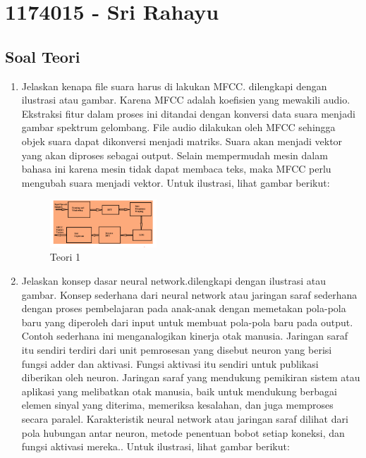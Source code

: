 \section{1174015 - 	Sri Rahayu}
\subsection{Soal Teori}
\begin{enumerate}

	\item Jelaskan kenapa file suara harus di lakukan MFCC. dilengkapi dengan ilustrasi atau gambar.
	\hfill\break
	Karena MFCC adalah koefisien yang mewakili audio. Ekstraksi fitur dalam proses ini ditandai dengan konversi data suara menjadi gambar spektrum gelombang. File audio dilakukan oleh MFCC sehingga objek suara dapat dikonversi menjadi matriks. Suara akan menjadi vektor yang akan diproses sebagai output. Selain mempermudah mesin dalam bahasa ini karena mesin tidak dapat membaca teks, maka MFCC perlu mengubah suara menjadi vektor. Untuk ilustrasi, lihat gambar berikut: 

	\begin{figure}[H]
	\centering
		\includegraphics[width=4cm]{figures/1174015/6/materi/teori1.PNG}
		\caption{Teori 1}
	\end{figure}

	\item Jelaskan konsep dasar neural network.dilengkapi dengan ilustrasi atau gambar.
	\hfill\break
	Konsep sederhana dari neural network atau jaringan saraf sederhana dengan proses pembelajaran pada anak-anak dengan memetakan pola-pola baru yang diperoleh dari input untuk membuat pola-pola baru pada output. Contoh sederhana ini menganalogikan kinerja otak manusia. Jaringan saraf itu sendiri terdiri dari unit pemrosesan yang disebut neuron yang berisi fungsi adder dan aktivasi. Fungsi aktivasi itu sendiri untuk publikasi diberikan oleh neuron. Jaringan saraf yang mendukung pemikiran sistem atau aplikasi yang melibatkan otak manusia, baik untuk mendukung berbagai elemen sinyal yang diterima, memeriksa kesalahan, dan juga memproses secara paralel. Karakteristik neural network atau jaringan saraf dilihat dari pola hubungan antar neuron, metode penentuan bobot setiap koneksi, dan fungsi aktivasi mereka.. Untuk ilustrasi, lihat gambar berikut: 


\end{enumerate}
